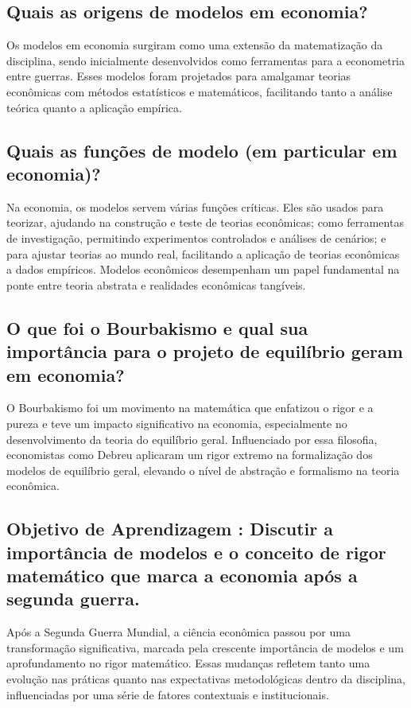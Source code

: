 \documentclass[a4paper,12pt]{article}[abntex2]
\begin{document}
\subsection{\textbf{Quais as origens de modelos em economia?}}
Os modelos em economia surgiram como uma extensão da matematização da disciplina, sendo inicialmente desenvolvidos como ferramentas para a econometria entre guerras. Esses modelos foram projetados para amalgamar teorias econômicas com métodos estatísticos e matemáticos, facilitando tanto a análise teórica quanto a aplicação empírica.

\subsection{\textbf{Quais as funções de modelo (em particular em economia)?}}
Na economia, os modelos servem várias funções críticas. Eles são usados para teorizar, ajudando na construção e teste de teorias econômicas; como ferramentas de investigação, permitindo experimentos controlados e análises de cenários; e para ajustar teorias ao mundo real, facilitando a aplicação de teorias econômicas a dados empíricos. Modelos econômicos desempenham um papel fundamental na ponte entre teoria abstrata e realidades econômicas tangíveis.

\subsection{\textbf{O que foi o Bourbakismo e qual sua importância para o projeto de equilíbrio geram em economia?}}
O Bourbakismo foi um movimento na matemática que enfatizou o rigor e a pureza e teve um impacto significativo na economia, especialmente no desenvolvimento da teoria do equilíbrio geral. Influenciado por essa filosofia, economistas como Debreu aplicaram um rigor extremo na formalização dos modelos de equilíbrio geral, elevando o nível de abstração e formalismo na teoria econômica.

\subsection{\textbf{Objetivo de Aprendizagem : Discutir a importância de modelos e o conceito de rigor matemático que marca a economia após a segunda guerra.}}
Após a Segunda Guerra Mundial, a ciência econômica passou por uma transformação significativa, marcada pela crescente importância de modelos e um aprofundamento no rigor matemático. Essas mudanças refletem tanto uma evolução nas práticas quanto nas expectativas metodológicas dentro da disciplina, influenciadas por uma série de fatores contextuais e institucionais.
\end{document}
